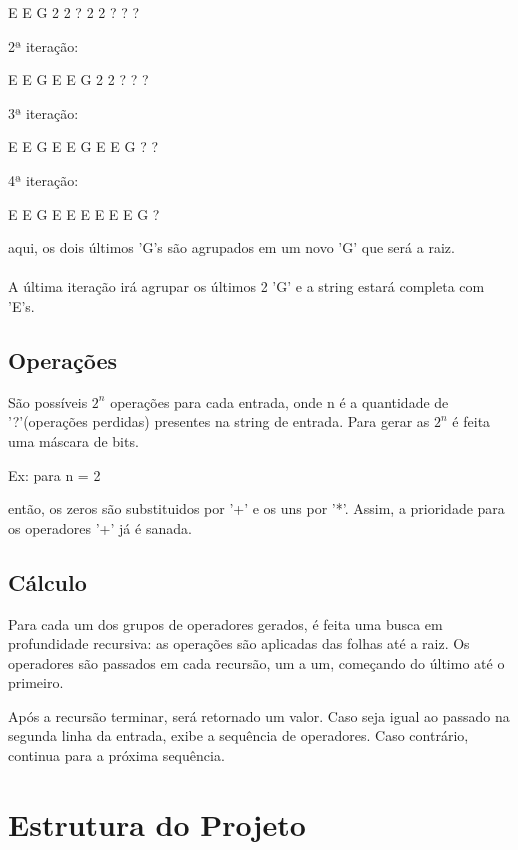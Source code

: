 \documentclass{article}
\begin{document}
{\centering
 E E G 2 2 ? 2 2 ? ? ?\par
}
2ª iteração:

{\centering
 E E G E E G 2 2 ? ? ?\par
}
3ª iteração:

{\centering
 E E G E E G E E G ? ?\par
}

4ª iteração:

{\centering
 E E G E E E E E E G ?\par
}

aqui, os dois últimos 'G's são agrupados em um novo 'G' que será a raiz.
\\
\\
A última iteração irá agrupar os últimos 2 'G' e a string estará completa com 'E's.

\subsection{Operações}
São possíveis $2^n$ operações para cada entrada, onde n é a quantidade de '?'(operações perdidas) presentes na string de entrada.
Para gerar as $2^n$ é feita uma máscara de bits.

Ex: para n = 2

{\par
}
{\par
}
{\par
}
{\par
}
então, os zeros são substituidos por '+' e os uns por '*'. Assim, a prioridade para os operadores '+' já é sanada.

\subsection{Cálculo}
Para cada um dos grupos de operadores gerados, é feita uma busca em profundidade recursiva: as operações são aplicadas das folhas até a raiz.
Os operadores são passados em cada recursão, um a um, começando do último até o primeiro.

Após a recursão terminar, será retornado um valor. Caso seja igual ao passado na segunda linha da entrada, exibe a sequência de operadores. Caso contrário, continua para a próxima sequência.


\section{Estrutura do Projeto}
\end{document}
